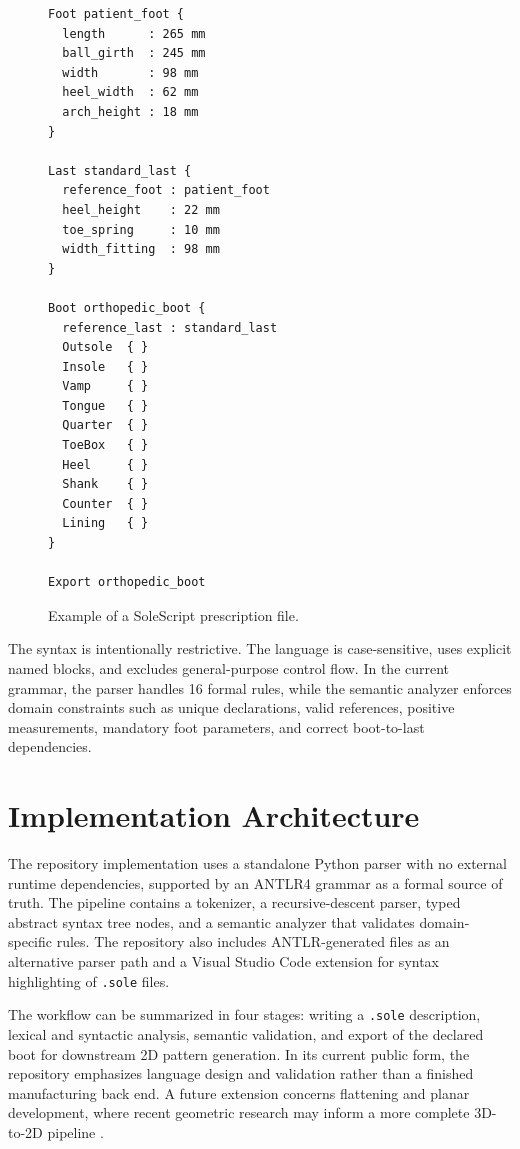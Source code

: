 \documentclass[12pt,a4paper]{article}
\begin{document}
\begin{figure}[htbp]
\centering
\begin{lstlisting}
Foot patient_foot {
  length      : 265 mm
  ball_girth  : 245 mm
  width       : 98 mm
  heel_width  : 62 mm
  arch_height : 18 mm
}

Last standard_last {
  reference_foot : patient_foot
  heel_height    : 22 mm
  toe_spring     : 10 mm
  width_fitting  : 98 mm
}

Boot orthopedic_boot {
  reference_last : standard_last
  Outsole  { }
  Insole   { }
  Vamp     { }
  Tongue   { }
  Quarter  { }
  ToeBox   { }
  Heel     { }
  Shank    { }
  Counter  { }
  Lining   { }
}

Export orthopedic_boot
\end{lstlisting}
\caption{Example of a SoleScript prescription file.}
\label{fig:solescript_example}
\end{figure}

The syntax is intentionally restrictive. The language is case-sensitive, uses explicit named blocks, and excludes general-purpose control flow. In the current grammar, the parser handles 16 formal rules, while the semantic analyzer enforces domain constraints such as unique declarations, valid references, positive measurements, mandatory foot parameters, and correct boot-to-last dependencies.

\section{Implementation Architecture}
The repository implementation uses a standalone Python parser with no external runtime dependencies, supported by an ANTLR4 grammar as a formal source of truth. The pipeline contains a tokenizer, a recursive-descent parser, typed abstract syntax tree nodes, and a semantic analyzer that validates domain-specific rules. The repository also includes ANTLR-generated files as an alternative parser path and a Visual Studio Code extension for syntax highlighting of \texttt{.sole} files.

The workflow can be summarized in four stages: writing a \texttt{.sole} description, lexical and syntactic analysis, semantic validation, and export of the declared boot for downstream 2D pattern generation. In its current public form, the repository emphasizes language design and validation rather than a finished manufacturing back end. A future extension concerns flattening and planar development, where recent geometric research may inform a more complete 3D-to-2D pipeline \cite{flatten2025}.
\end{document}
